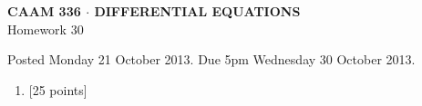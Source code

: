 \documentclass[10pt]{article}
\begin{document}
\vspace*{-5em}
\begin{center}
\large \textsf{\textbf{CAAM 336 $\cdot$ DIFFERENTIAL EQUATIONS}\\[0.5em]
Homework 30 }
\end{center}

Posted Monday 21 October 2013.  Due 5pm Wednesday 30 October 2013.

\begin{enumerate}\addtocounter{enumi}{29}
\item {[25 points]}  
\end{enumerate}
\end{document}
